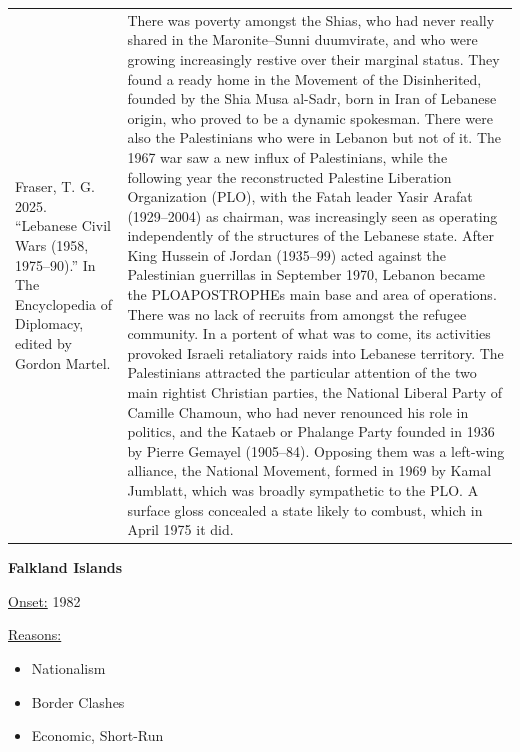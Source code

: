 {\begin{longtable}{p{}p{}}
Fraser, T. G. 2025. “Lebanese Civil Wars (1958, 1975–90).” In The Encyclopedia of Diplomacy, edited by Gordon Martel. & There was poverty amongst the Shias, who had never really shared in the Maronite–Sunni duumvirate, and who were growing increasingly restive over their marginal status. They found a ready home in the Movement of the Disinherited, founded by the Shia Musa al-Sadr, born in Iran of Lebanese origin, who proved to be a dynamic spokesman. There were also the Palestinians who were in Lebanon but not of it. The 1967 war saw a new influx of Palestinians, while the following year the reconstructed Palestine Liberation Organization (PLO), with the Fatah leader Yasir Arafat (1929–2004) as chairman, was increasingly seen as operating independently of the structures of the Lebanese state. After King Hussein of Jordan (1935–99) acted against the Palestinian guerrillas in September 1970, Lebanon became the PLOAPOSTROPHEs main base and area of operations. There was no lack of recruits from amongst the refugee community. In a portent of what was to come, its activities provoked Israeli retaliatory raids into Lebanese territory. The Palestinians attracted the particular attention of the two main rightist Christian parties, the National Liberal Party of Camille Chamoun, who had never renounced his role in politics, and the Kataeb or Phalange Party founded in 1936 by Pierre Gemayel (1905–84). Opposing them was a left-wing alliance, the National Movement, formed in 1969 by Kamal Jumblatt, which was broadly sympathetic to the PLO. A surface gloss concealed a state likely to combust, which in April 1975 it did.
\\
\end{longtable}}
\clearpage
         \textbf{Falkland Islands} 

          \underline{Onset:} 1982         

\underline{Reasons:}
\begin{itemize}
\item Nationalism
\item Border Clashes
\item Economic, Short-Run
\end{itemize}

